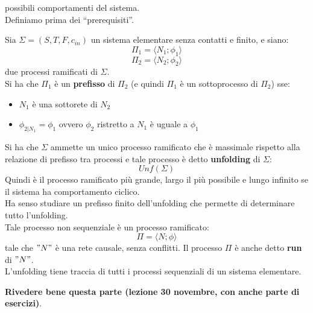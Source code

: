 possibili comportamenti del sistema.\\
Definiamo prima dei ``prerequisiti''.
\begin{definizione}
  Sia $\Sigma=(S, T, F, c_{in})$ un sistema elementare senza contatti e finito, e
  siano:
  \[\Pi_1=\langle N_1;\phi_1\rangle\]
  \[\Pi_2=\langle N_2;\phi_2\rangle\]
  due processi ramificati di $\Sigma$.\\
  Si ha che $\Pi_1$ è un \textbf{prefisso} di $\Pi_2$ (e quindi $\Pi_1$ è un
  sottoprocesso di $\Pi_2$) sse:
  \begin{itemize}
    \item $N_1$ è una sottorete di $N_2$
    \item $\phi_{2|N_1}=\phi_1$ ovvero $\phi_2$ ristretto a $N_1$  è uguale a
    $\phi_1$ 
  \end{itemize}
  Si ha che $\Sigma$ ammette un unico processo ramificato che è massimale
  rispetto alla relazione di prefisso tra processi e tale processo è detto
  \textbf{unfolding} di $\Sigma$:
  \[Unf(\Sigma)\]
  Quindi è il processo ramificato più grande, largo il più possibile e lungo
  infinito se il sistema ha comportamento ciclico.\\
  Ha senso studiare un prefisso finito dell'unfolding che permette di
  determinare tutto l'unfolding.\\
  Tale processo non sequenziale è un processo ramificato:
  \[\Pi=\langle N;\phi\rangle\]
  tale che $"N"$ è una rete causale, senza conflitti. Il processo $\Pi$ è anche
  detto \textbf{run} di $"N"$.\\
  L'unfolding tiene traccia di tutti i processi sequenziali di un sistema
  elementare. 
\end{definizione} \vspace{5mm} %
\textbf{Rivedere bene questa parte (lezione 30 novembre, con anche parte di
  esercizi)}.\\

